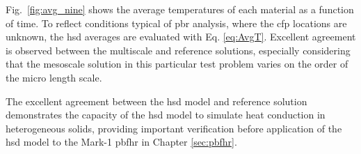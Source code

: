 Fig.\ \ref{fig:avg_nine} shows the average temperatures of each material as a function of time. To reflect conditions typical of \gls{pbr} analysis, where the \gls{cfp} locations are unknown, the \gls{hsd} averages are evaluated with Eq. \eqref{eq:AvgT}. Excellent agreement is observed between the multiscale and reference solutions, especially considering that the mesoscale solution in this particular test problem varies on the order of the micro length scale.

The excellent agreement between the \gls{hsd} model and reference solution demonstrates the capacity of the \gls{hsd} model to simulate heat conduction in heterogeneous solids, providing important verification before application of the \gls{hsd} model to the Mark-1 \gls{pbfhr} in Chapter \ref{sec:pbfhr}.